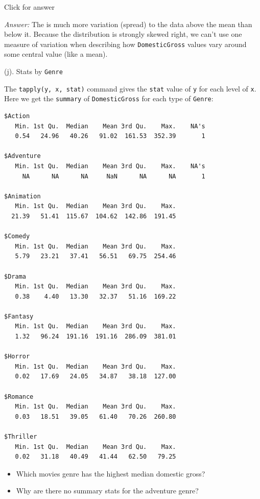 \documentclass[
]{book}
\newenvironment{Shaded}{\begin{snugshade}}{\end{snugshade}}
\newcommand{\FunctionTok}[1]{\textcolor[rgb]{0.00,0.00,0.00}{#1}}
\newcommand{\NormalTok}[1]{#1}
\newcommand{\SpecialCharTok}[1]{\textcolor[rgb]{0.00,0.00,0.00}{#1}}
\providecommand{\tightlist}{%
  \setlength{\itemsep}{0pt}\setlength{\parskip}{0pt}}
\begin{document}
Click for answer

\emph{Answer:} The is much more variation (spread) to the data above the mean than below it. Because the distribution is strongly skewed right, we can't use one measure of variation when describing how \texttt{DomesticGross} values vary around some central value (like a mean).

(j). Stats by \texttt{Genre}

The \texttt{tapply(y,\ x,\ stat)} command gives the \texttt{stat} value of \texttt{y} for each level of \texttt{x}. Here we get the \texttt{summary} of \texttt{DomesticGross} for each type of \texttt{Genre}:

\begin{Shaded}
\end{Shaded}

\begin{verbatim}
$Action
   Min. 1st Qu.  Median    Mean 3rd Qu.    Max.    NA's 
   0.54   24.96   40.26   91.02  161.53  352.39       1 

$Adventure
   Min. 1st Qu.  Median    Mean 3rd Qu.    Max.    NA's 
     NA      NA      NA     NaN      NA      NA       1 

$Animation
   Min. 1st Qu.  Median    Mean 3rd Qu.    Max. 
  21.39   51.41  115.67  104.62  142.86  191.45 

$Comedy
   Min. 1st Qu.  Median    Mean 3rd Qu.    Max. 
   5.79   23.21   37.41   56.51   69.75  254.46 

$Drama
   Min. 1st Qu.  Median    Mean 3rd Qu.    Max. 
   0.38    4.40   13.30   32.37   51.16  169.22 

$Fantasy
   Min. 1st Qu.  Median    Mean 3rd Qu.    Max. 
   1.32   96.24  191.16  191.16  286.09  381.01 

$Horror
   Min. 1st Qu.  Median    Mean 3rd Qu.    Max. 
   0.02   17.69   24.05   34.87   38.18  127.00 

$Romance
   Min. 1st Qu.  Median    Mean 3rd Qu.    Max. 
   0.03   18.51   39.05   61.40   70.26  260.80 

$Thriller
   Min. 1st Qu.  Median    Mean 3rd Qu.    Max. 
   0.02   31.18   40.49   41.44   62.50   79.25 
\end{verbatim}

\begin{itemize}
\tightlist
\item
  Which movies genre has the highest median domestic gross?
\item
  Why are there no summary stats for the adventure genre?
\end{itemize}
\end{document}
